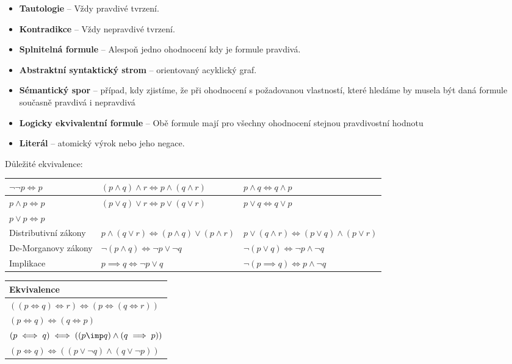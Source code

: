 \begin{itemize}
\item \textbf{Tautologie} --  Vždy pravdivé tvrzení.
\item \textbf{Kontradikce} --  Vždy nepravdivé tvrzení.
\item \textbf{Splnitelná formule} -- Alespoň jedno ohodnocení kdy je formule pravdivá.
\item \textbf{Abstraktní syntaktický strom} -- orientovaný acyklický graf.
\item \textbf{Sémantický spor} -- případ, kdy zjistíme, že při ohodnocení s požadovanou vlastností, které hledáme by musela být daná formule současně pravdivá i nepravdivá
\item \textbf{Logicky ekvivalentní formule} -- Obě formule mají pro všechny ohodnocení stejnou pravdivostní hodnotu
\item \textbf{Literál} -- atomický výrok nebo jeho negace.
\end{itemize}

Důležité ekvivalence:
\begin{table}[h!]
\begin{tabular}{l | l | l}
\hline
$\neg\neg p \iff p$ & $(p \wedge q) \wedge r \iff p \wedge (q \wedge r)$ & $p \wedge q \iff q \wedge p$ \\
\hline
$p \wedge p \iff p$ & $(p \vee q) \vee r \iff p \vee (q \vee r)$  & $p \vee q \iff q \vee p$ \\
\hline
$p \vee p \iff p$ & & \\
\hline
Distributivní zákony & $p \wedge (q \vee r) \iff (p \wedge q) \vee (p \wedge r)$ & $p \vee (q \wedge r) \iff (p \vee q) \wedge (p \vee r)$ \\
\hline
De-Morganovy zákony& $\neg(p \wedge q) \iff \neg p \vee \neg q$ & $\neg(p \vee q) \iff \neg p \wedge \neg q$ \\
\hline
Implikace & $p \implies q \iff \neg p \vee q$ & $\neg(p \implies q) \iff p \wedge \neg q$ \\

\end{tabular}
\end{table}
\begin{table}[h!]
\begin{tabular}{l}
\hline
Ekvivalence   \\
\hline
$((p \iff q) \iff r) \iff (p \iff (q \iff r))$ \\
\hline
$(p \iff q) \iff (q \iff p)$ \\
$(p \iff q) \iff( (p \imp q) \wedge (q \implies p))$ \\
\hline
$(p \iff q) \iff ((p \vee \neg q) \wedge (q \vee \neg p))$ \\
\hline
\end{tabular}
\end{table}






